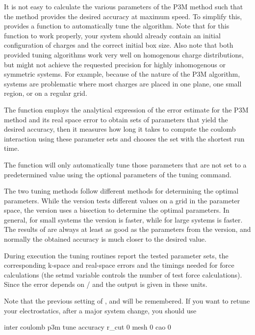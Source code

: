 It is not easy to calculate the various parameters of the P3M method
such that the method provides the desired accuracy at maximum speed.
To simplify this, \es{} provides a function to automatically tune the
algorithm.  Note that for this function to work properly, your system
should already contain an initial configuration of charges and the
correct initial box size. Also note that both provided tuning
algorithms work very well on homogenous charge distributions, but
might not achieve the requested precision for highly inhomogenous or
symmetric systems. For example, because of the nature of the P3M
algorithm, systems are problematic where most charges are placed in
one plane, one small region, or on a regular grid.

The function employs the analytical expression of the error estimate
for the P3M method \cite{hockney88} and its real space error
\cite{kolafa92} to obtain sets of parameters that yield the desired
accuracy, then it measures how long it takes to compute the coulomb
interaction using these parameter sets and chooses the set with the
shortest run time.

The function will only automatically tune those parameters that are
not set to a predetermined value using the optional parameters of the
tuning command.

The two tuning methods follow different methods for determining the
optimal parameters. While the  version tests different
values on a grid in the parameter space, the  version
uses a bisection to determine the optimal parameters.  In general, for
small systems the  version is faster, while for large
systems  is faster. The results of 
are always at least as good as the parameters from the 
version, and normally the obtained accuracy is much closer to the
desired value.

During execution the tuning routines report the tested parameter sets,
the corresponding k-space and real-space errors and the timings needed
for force calculations (the setmd variable  controls the
number of test force calculations).  Since the error depends on
/ and \var{\alpha} the
output is given in these units.

Note that the previous setting of ,  and
 will be remembered.  If you want to retune your
electrostatics, \eg after a major system change, you should use
\begin{code}
  inter coulomb  p3m tune accuracy  r_cut 0 mesh 0 cao 0
\end{code}

